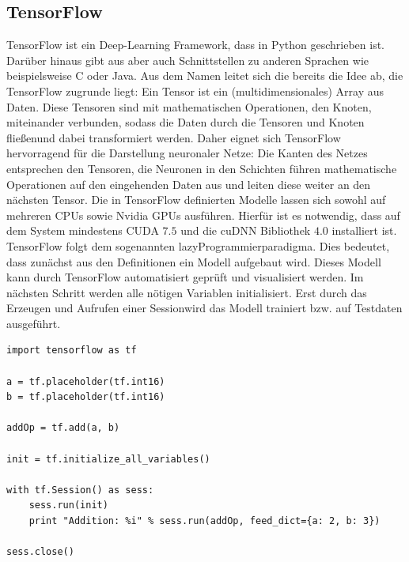 \subsection{TensorFlow}

TensorFlow ist ein Deep-Learning Framework, dass in Python geschrieben ist. Darüber hinaus gibt aus aber auch Schnittstellen zu anderen Sprachen wie beispielsweise C oder Java. Aus dem Namen leitet sich die bereits die Idee ab, die TensorFlow zugrunde liegt: Ein Tensor ist ein (multidimensionales) Array aus Daten. Diese Tensoren sind mit mathematischen Operationen, den Knoten, miteinander verbunden, sodass die Daten durch die Tensoren und Knoten \grqq fließen\grqq und dabei transformiert werden. Daher eignet sich TensorFlow hervorragend für die Darstellung neuronaler Netze: Die Kanten des Netzes entsprechen den Tensoren, die Neuronen in den Schichten führen mathematische Operationen auf den eingehenden Daten aus und leiten diese weiter an den nächsten Tensor. Die in TensorFlow definierten Modelle lassen sich sowohl auf mehreren CPUs sowie Nvidia GPUs ausführen. Hierfür ist es notwendig, dass auf dem System mindestens CUDA $7.5$ und die cuDNN Bibliothek $4.0$ installiert ist. 
TensorFlow folgt dem sogenannten \glqq lazy\grqq  Programmierparadigma. Dies bedeutet, dass zunächst aus den Definitionen ein Modell aufgebaut wird. Dieses Modell kann durch TensorFlow automatisiert geprüft und visualisiert werden. Im nächsten Schritt werden alle nötigen Variablen initialisiert. Erst durch das Erzeugen und Aufrufen einer \glqq Session\grqq wird das Modell trainiert bzw. auf Testdaten ausgeführt.

\lstset{language=Python}
\begin{lstlisting}
import tensorflow as tf

a = tf.placeholder(tf.int16)
b = tf.placeholder(tf.int16)

addOp = tf.add(a, b)

init = tf.initialize_all_variables()

with tf.Session() as sess:
    sess.run(init)
    print "Addition: %i" % sess.run(addOp, feed_dict={a: 2, b: 3})

sess.close()
\end{lstlisting}